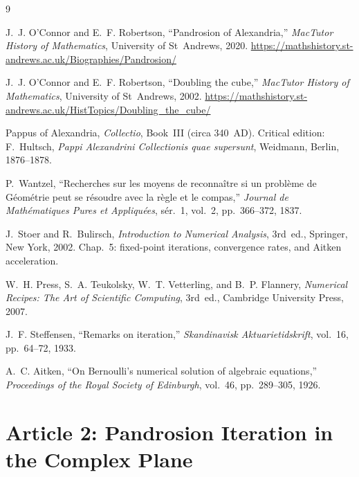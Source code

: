 \documentclass[10pt,a4paper,oneside]{book}
\theoremstyle{definition}
\theoremstyle{remark}
\begin{document}
\begin{thebibliography}{9}

J.~J. O'Connor and E.~F. Robertson,
``Pandrosion of Alexandria,''
\textit{MacTutor History of Mathematics}, University of St~Andrews, 2020.
\url{https://mathshistory.st-andrews.ac.uk/Biographies/Pandrosion/}

J.~J. O'Connor and E.~F. Robertson,
``Doubling the cube,''
\textit{MacTutor History of Mathematics}, University of St~Andrews, 2002.
\url{https://mathshistory.st-andrews.ac.uk/HistTopics/Doubling_the_cube/}

Pappus of Alexandria,
\textit{Collectio}, Book~III (circa 340~AD).
Critical edition: F.~Hultsch, \textit{Pappi Alexandrini Collectionis quae supersunt},
Weidmann, Berlin, 1876--1878.

P.~Wantzel,
``Recherches sur les moyens de reconna\^itre si un probl\`eme de G\'eom\'etrie peut se r\'esoudre avec la r\`egle et le compas,''
\textit{Journal de Math\'ematiques Pures et Appliqu\'ees}, s\'er.~1, vol.~2, pp.~366--372, 1837.

J.~Stoer and R.~Bulirsch,
\textit{Introduction to Numerical Analysis},
3rd~ed., Springer, New York, 2002.
Chap.~5: fixed-point iterations, convergence rates, and Aitken acceleration.

W.~H. Press, S.~A. Teukolsky, W.~T. Vetterling, and B.~P. Flannery,
\textit{Numerical Recipes: The Art of Scientific Computing},
3rd~ed., Cambridge University Press, 2007.

J.~F. Steffensen,
``Remarks on iteration,''
\textit{Skandinavisk Aktuarietidskrift}, vol.~16, pp.~64--72, 1933.

A.~C. Aitken,
``On Bernoulli's numerical solution of algebraic equations,''
\textit{Proceedings of the Royal Society of Edinburgh}, vol.~46, pp.~289--305, 1926.

\end{thebibliography}





\chapter{Article 2: Pandrosion Iteration in the Complex Plane}
\graphicspath{{../figures/}}
\end{document}
